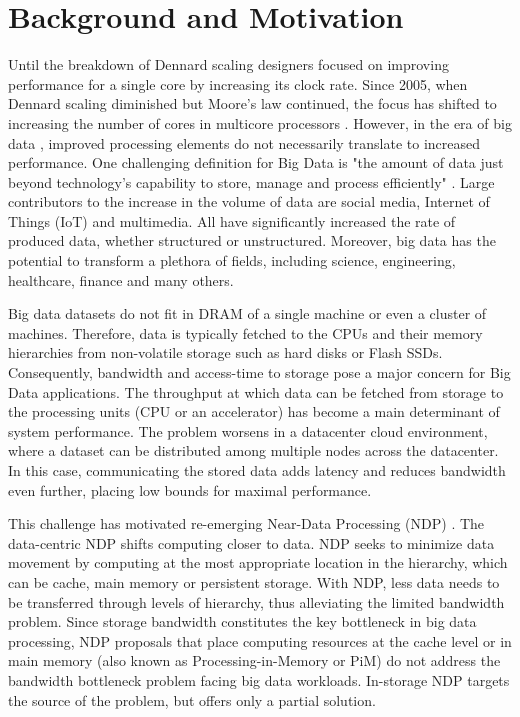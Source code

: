 \documentclass{superfri}
\begin{document}
\section{Background and Motivation}
\label{sec:motivation}
Until the breakdown of Dennard scaling designers focused on improving performance for a single core by increasing its clock rate. Since 2005, when Dennard scaling diminished but Moore's law continued, the focus has shifted to increasing the number of cores in multicore processors \cite{esmaeilzadeh2011dark}. However, in the era of big data \cite{foster1976content}, improved processing elements do not necessarily translate to increased performance. One challenging definition for Big Data is "the amount of data just beyond technology's capability to store, manage and process efficiently" \cite{kaisler2013big}. Large contributors to the increase in the volume of data are social media, Internet of Things (IoT) and multimedia. All have significantly increased the rate of produced data, whether structured or unstructured. Moreover, big data has the potential to transform a plethora of fields, including science, engineering, healthcare, finance and many others.

Big data datasets do not fit in DRAM of a single machine or even a cluster of machines. Therefore, data is typically fetched to the CPUs and their memory hierarchies from non-volatile storage such as hard disks or Flash SSDs. Consequently, bandwidth and access-time to storage pose a major concern for Big Data applications. The throughput at which data can be fetched from storage to the processing units (CPU or an accelerator) has become a main determinant of system performance. The problem worsens in a datacenter cloud environment, where a dataset can be distributed among multiple nodes across the datacenter. In this case, communicating the stored data adds latency and reduces bandwidth even further, placing low bounds for maximal performance.

This challenge has motivated re-emerging Near-Data Processing (NDP) \cite{balasubramonian2014near}. The data-centric NDP shifts computing closer to data. NDP seeks to minimize data movement by computing at the most appropriate location in the hierarchy, which can be cache, main memory or persistent storage. With NDP, less data needs to be transferred through levels of hierarchy, thus alleviating the limited bandwidth problem. Since storage bandwidth constitutes the key bottleneck in big data processing, NDP proposals that place computing resources at the cache level \cite{yavits2015computer} or in main memory \cite{guo2011resistive}\cite{ahn2015scalable}\cite{de2016cudalign} (also known as Processing-in-Memory or PiM) do not address the bandwidth bottleneck problem facing big data workloads. In-storage NDP targets the source of the problem, but offers only a partial solution.
\end{document}
